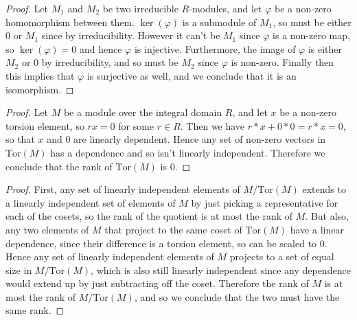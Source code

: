 \documentclass[11pt]{article}
\begin{document}
\begin{proof}
  Let $M_1$ and $M_2$ be two irreducible $R$-modules, and let $\varphi$ be a non-zero homomorphism between them.
  $\ker(\varphi)$ is a submodule of $M_1$, so must be either $0$ or $M_1$ since by irreducibility.
  However it can't be $M_1$ since $\varphi$ is a non-zero map, so $\ker(\varphi) = 0$ and hence $\varphi$ is injective.
  Furthermore, the image of $\varphi$ is either $M_2$ or $0$ by irreducibility, and so must be $M_2$ since $\varphi$ is non-zero.
  Finally then this implies that $\varphi$ is surjective as well, and we conclude that it is an isomorphism.
\end{proof}


\begin{proof}
  Let $M$ be a module over the integral domain $R$, and let $x$ be a non-zero torsion element, so $rx = 0$ for some $r \in R$.
  Then we have $r*x + 0*0 = r*x = 0$, so that $x$ and $0$ are linearly dependent.
  Hence any set of non-zero vectors in $\text{Tor}(M)$ has a dependence and so isn't linearly independent.
  Therefore we conclude that the rank of $\text{Tor}(M)$ is $0$.
\end{proof}

\begin{proof}
  First, any set of linearly independent elements of $M/\text{Tor}(M)$ extends to a linearly independent set of elements of $M$ by just picking a representative for each of the cosets, so the rank of the quotient is at most the rank of $M$.
  But also, any two elements of $M$ that project to the same coset of $\text{Tor}(M)$ have a linear dependence, since their difference is a torsion element, so can be scaled to $0$.
  Hence any set of linearly independent elements of $M$ projects to a set of equal size in $M/\text{Tor}(M)$, which is also still linearly independent since any dependence would extend up by just subtracting off the coset.
  Therefore the rank of $M$ is at most the rank of $M/\text{Tor}(M)$, and so we conclude that the two must have the same rank.
\end{proof}
\end{document}
